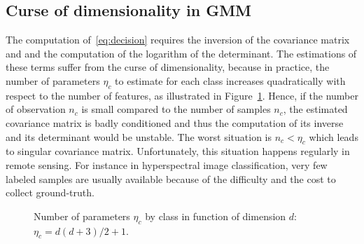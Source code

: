 \documentclass[journal,peerreview,onecolumn]{IEEEtran}
\begin{document}
    \subsection{Curse of dimensionality in GMM}
    \label{sec:curse:gmm}

    The computation of~\ref{eq:decision} requires the inversion of the
    covariance matrix and and the  computation of the logarithm of the
    determinant.  The estimations of these terms suffer from the curse
    of  dimensionality\cite{bouveyron2014model}, because  in practice,
    the  number of  parameters  $\eta_c$ to  estimate  for each  class
    increases quadratically with respect to the number of features, as
    illustrated in Figure~\ref{fig:nb-param}.  Hence, if the number of
    observation  $n_c$ is  small  compared to  the  number of  samples
    $n_c$, the  estimated covariance  matrix is badly  conditioned and
    thus the computation  of its inverse and its  determinant would be
    unstable.   The worst  situation  is $n_c<\eta_c$  which leads  to
    singular covariance matrix.  Unfortunately, this situation happens
    regularly in remote sensing.   For instance in hyperspectral image
    classification,  very few  labeled samples  are usually  available
    because of the difficulty and the cost to collect ground-truth.

    \begin{figure}[!t]
        \centering
        \caption{Number of parameters $\eta_c$ by class in function of dimension $d$: $\eta_c=d(d+3)/2+1$.\label{fig:nb-param}}
    \end{figure}
\end{document}
